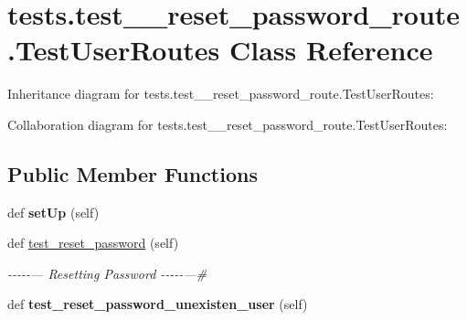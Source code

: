 \hypertarget{classtests_1_1test__7__reset__password__route_1_1_test_user_routes}{}\section{tests.\+test\+\_\+\_\+reset\+\_\+password\+\_\+route.\+Test\+User\+Routes Class Reference}
\label{classtests_1_1test__7__reset__password__route_1_1_test_user_routes}


Inheritance diagram for tests.\+test\+\_\+\_\+reset\+\_\+password\+\_\+route.\+Test\+User\+Routes\+:


Collaboration diagram for tests.\+test\+\_\+\_\+reset\+\_\+password\+\_\+route.\+Test\+User\+Routes\+:
\subsection*{Public Member Functions}
\begin{DoxyCompactItemize}
\item 
\mbox{\label{classtests_1_1test__7__reset__password__route_1_1_test_user_routes_ae830aca1baab5e540160786a9943d935}} 
def {\bfseries set\+Up} (self)
\item 
\mbox{\label{classtests_1_1test__7__reset__password__route_1_1_test_user_routes_a0612de233e6afd95db7c1b6661d1b523}} 
def \hyperlink{classtests_1_1test__7__reset__password__route_1_1_test_user_routes_a0612de233e6afd95db7c1b6661d1b523}{test\+\_\+reset\+\_\+password} (self)
\begin{DoxyCompactList}\small\item\em -\/-\/-\/-\/-\/--- Resetting Password -\/-\/-\/-\/-\/---\# \end{DoxyCompactList}\item 
\mbox{\label{classtests_1_1test__7__reset__password__route_1_1_test_user_routes_aaf35685e09e7da11e134363507ddd24a}} 
def {\bfseries test\+\_\+reset\+\_\+password\+\_\+unexisten\+\_\+user} (self)
\end{DoxyCompactItemize}
